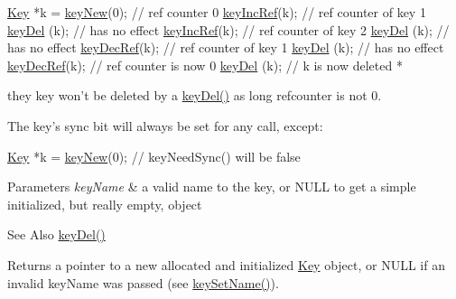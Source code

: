 \begin{DoxyCode}
\hyperlink{classkdb_1_1Key_a5679f5cae63caddd64a60388b9cc77fa}{Key} *k = \hyperlink{group__key_gaf6893c038b3ebee90c73a9ea8356bebf}{keyNew}(0); \textcolor{comment}{// ref counter 0}
\hyperlink{group__key_ga6970a6f254d67af7e39f8e469bb162f1}{keyIncRef}(k); \textcolor{comment}{// ref counter of key 1}
\hyperlink{group__key_ga3df95bbc2494e3e6703ece5639be5bb1}{keyDel} (k);   \textcolor{comment}{// has no effect}
\hyperlink{group__key_ga6970a6f254d67af7e39f8e469bb162f1}{keyIncRef}(k); \textcolor{comment}{// ref counter of key 2}
\hyperlink{group__key_ga3df95bbc2494e3e6703ece5639be5bb1}{keyDel} (k);   \textcolor{comment}{// has no effect}
\hyperlink{group__key_ga2c6433ca22109e4e141946057eccb283}{keyDecRef}(k); \textcolor{comment}{// ref counter of key 1}
\hyperlink{group__key_ga3df95bbc2494e3e6703ece5639be5bb1}{keyDel} (k);   \textcolor{comment}{// has no effect}
\hyperlink{group__key_ga2c6433ca22109e4e141946057eccb283}{keyDecRef}(k); \textcolor{comment}{// ref counter is now 0}
\hyperlink{group__key_ga3df95bbc2494e3e6703ece5639be5bb1}{keyDel} (k); \textcolor{comment}{// k is now deleted}
 *
\end{DoxyCode}


they key won't be deleted by a \hyperlink{group__key_ga3df95bbc2494e3e6703ece5639be5bb1}{key\-Del()} as long refcounter is not 0.

The key's sync bit will always be set for any call, except\-: 
\begin{DoxyCode}
\hyperlink{classkdb_1_1Key_a5679f5cae63caddd64a60388b9cc77fa}{Key} *k = \hyperlink{group__key_gaf6893c038b3ebee90c73a9ea8356bebf}{keyNew}(0);
\textcolor{comment}{// keyNeedSync() will be false}
\end{DoxyCode}



\begin{DoxyParams}{Parameters}
{\em key\-Name} & a valid name to the key, or N\-U\-L\-L to get a simple initialized, but really empty, object \\
\hline
\end{DoxyParams}
\begin{DoxySeeAlso}{See Also}
\hyperlink{group__key_ga3df95bbc2494e3e6703ece5639be5bb1}{key\-Del()} 
\end{DoxySeeAlso}
\begin{DoxyReturn}{Returns}
a pointer to a new allocated and initialized \hyperlink{classkdb_1_1Key}{Key} object, or N\-U\-L\-L if an invalid {\ttfamily key\-Name} was passed (see \hyperlink{group__keyname_ga7699091610e7f3f43d2949514a4b35d9}{key\-Set\-Name()}). 
\end{DoxyReturn}



